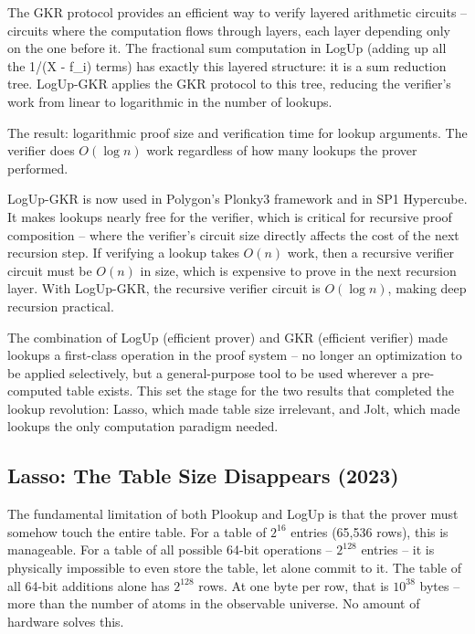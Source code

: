 \documentclass[
  11pt,
  openany]{report}
\begin{document}
The GKR protocol provides an efficient way to verify layered arithmetic circuits
-- circuits where the computation flows through layers, each layer depending
only on the one before it. The fractional sum computation in LogUp (adding up
all the 1/(X - f\_i) terms) has exactly this layered structure: it is a sum
reduction tree. LogUp-GKR applies the GKR protocol to this tree, reducing the
verifier's work from linear to logarithmic in the number of lookups.

The result: logarithmic proof size and verification time for lookup arguments.
The verifier does \(O(\log n)\) work regardless of how many lookups the prover
performed.

LogUp-GKR is now used in Polygon's Plonky3 framework and in SP1 Hypercube. It
makes lookups nearly free for the verifier, which is critical for recursive
proof composition -- where the verifier's circuit size directly affects the cost
of the next recursion step. If verifying a lookup takes \(O(n)\) work, then a
recursive verifier circuit must be \(O(n)\) in size, which is expensive to prove
in the next recursion layer. With LogUp-GKR, the recursive verifier circuit is
\(O(\log n)\), making deep recursion practical.

The combination of LogUp (efficient prover) and GKR (efficient verifier) made
lookups a first-class operation in the proof system -- no longer an optimization
to be applied selectively, but a general-purpose tool to be used wherever a
pre-computed table exists. This set the stage for the two results that completed
the lookup revolution: Lasso, which made table size irrelevant, and Jolt, which
made lookups the only computation paradigm needed.

\subsection{Lasso: The Table Size Disappears
(2023)}\label{lasso-the-table-size-disappears-2023}

The fundamental limitation of both Plookup and LogUp is that the prover must
somehow touch the entire table. For a table of \(2^{16}\) entries (65,536 rows),
this is manageable. For a table of all possible 64-bit operations -- \(2^{128}\)
entries -- it is physically impossible to even store the table, let alone commit
to it. The table of all 64-bit additions alone has \(2^{128}\) rows. At one byte
per row, that is \(10^{38}\) bytes -- more than the number of atoms in the
observable universe. No amount of hardware solves this.
\end{document}

